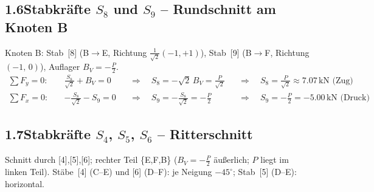 \documentclass[a4paper,11pt]{article}
\begin{document}
\begin{center}
\end{center}


\subsection*{1.6\quad Stabkräfte $S_8$ und $S_9$ -- Rundschnitt am Knoten B}

Knoten B: Stab~[8] (B$\to$E, Richtung $\tfrac{1}{\sqrt{2}}(-1,+1)$),
Stab~[9] (B$\to$F, Richtung $(-1,\,0)$), Auflager $B_V = -\tfrac{P}{2}$.
\begin{align*}
  \sum F_y = 0:\quad & \tfrac{S_8}{\sqrt{2}} + B_V = 0
    &&\Rightarrow\quad S_8 = -\sqrt{2}\,B_V = \tfrac{P}{\sqrt{2}}
       &&\Rightarrow\quad \boxed{S_8 = \tfrac{P}{\sqrt{2}} \approx 7.07\,\text{kN (Zug)}} \\
  \sum F_x = 0:\quad & -\tfrac{S_8}{\sqrt{2}} - S_9 = 0
    &&\Rightarrow\quad S_9 = -\tfrac{S_8}{\sqrt{2}} = -\tfrac{P}{2}
       &&\Rightarrow\quad \boxed{S_9 = -\tfrac{P}{2} = -5.00\,\text{kN (Druck)}}
\end{align*}

\subsection*{1.7\quad Stabkräfte $S_4$, $S_5$, $S_6$ -- Ritterschnitt}

Schnitt durch [4],[5],[6]; rechter Teil \{E,F,B\} ($B_V = -\tfrac{P}{2}$ äußerlich; $P$ liegt im linken Teil).
Stäbe~[4] (C--E) und [6] (D--F): je Neigung $-45^\circ$; Stab~[5] (D--E): horizontal.
\end{document}
